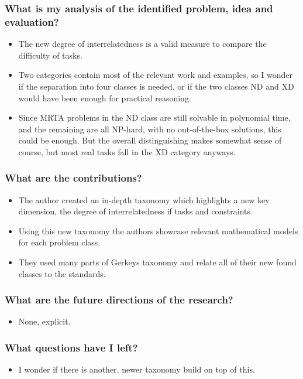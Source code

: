 \documentclass{article}
\begin{document}
\subsubsection*{What is my analysis of the identified problem, idea and evaluation?}
\begin{itemize}
    \item The new degree of interrelatedness is a valid measure to compare the difficulty of tasks. 
    \item Two categories contain most of the relevant work and examples, so I wonder if the separation into four classes is needed, or if the two classes ND and XD would have been enough for practical reasoning. 
    \item Since MRTA problems in the ND class are still solvable in polynomial time, and the remaining are all NP-hard, with no out-of-the-box solutions, this could be enough. But the overall distinguishing makes somewhat sense of course, but most real tasks fall in the XD category anyways.
\end{itemize}
\subsubsection*{What are the contributions?}
\begin{itemize}
    \item The author created an in-depth taxonomy which highlights a new key dimension, the degree of interrelatedness if tasks and constraints.
    \item Using this new taxonomy the authors showcase relevant mathematical models for each problem class.
    \item They used many parts of Gerkeys taxonomy and relate all of their new found classes to the standards. 
\end{itemize}
\subsubsection*{What are the future directions of the research?}
\begin{itemize}
    \item None, explicit. 
\end{itemize}
\subsubsection*{What questions have I left?}
\begin{itemize}
    \item I wonder if there is another, newer taxonomy build on top of this.
\end{itemize}
\end{document}
